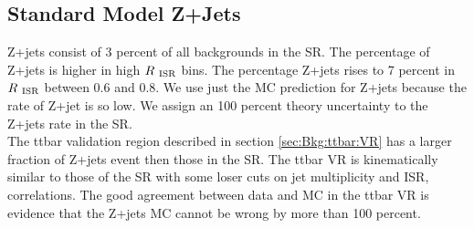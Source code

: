 
\subsection{Standard Model Z+Jets}
\label{sec:Bkg:zjet}

Z+jets consist of 3 percent of all backgrounds in the SR.  The percentage of Z+jets is higher in high $R_{~\mathrm{ISR}}$ bins.  The percentage Z+jets rises to 7 percent in $R_{~\mathrm{ISR}}$ between 0.6 and 0.8.  We use just the MC prediction for Z+jets because the rate of Z+jet is so low.  We assign an 100 percent theory uncertainty to the Z+jets rate in the SR.  \\
The ttbar validation region described in section \ref{sec:Bkg:ttbar:VR} has a larger fraction of Z+jets event then those in the SR.  The ttbar VR is kinematically similar to those of the SR with some loser cuts on jet multiplicity and ISR, \MET correlations.  The good agreement between data and MC in the ttbar VR is evidence that the Z+jets MC cannot be wrong by more than 100 percent.  \\